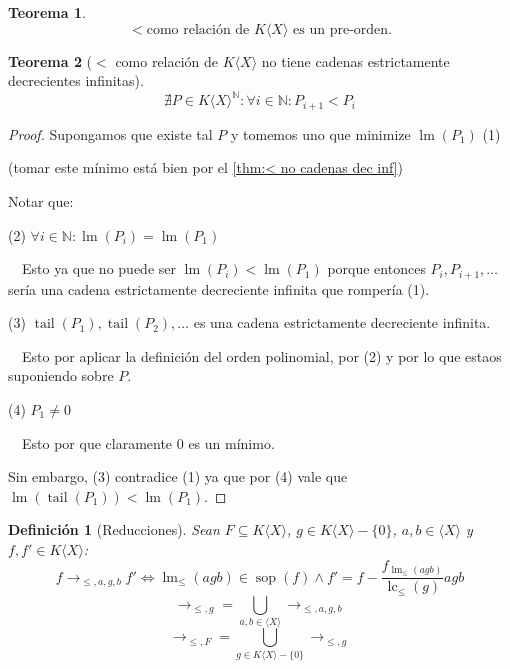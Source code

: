 \documentclass[fleqn]{amsbook} %
\theoremstyle{customstyle}
\newtheorem{definition}{Definición}[section]
\newtheorem{theorem}{Teorema}[section]
\DeclareMathOperator{\sop}{sop}
\DeclareMathOperator{\lm}{lm}
\DeclareMathOperator{\lc}{lc}
\DeclareMathOperator{\tail}{tail}
\begin{document}
\begin{theorem}
\[ < \text{como relación de }K⟨X⟩\text{ es un pre-orden.} \]
\end{theorem}

\begin{theorem}[$<$ como relación de $K⟨X⟩$ no tiene cadenas estrictamente decrecientes infinitas]\label{thm:< en KX no cadenas dec inf}
\[ ∄P ∈ K⟨X⟩^ℕ : ∀i ∈ ℕ : P_{i + 1} < P_i \]
\end{theorem}
\begin{proof}
Supongamos que existe tal $P$ y tomemos uno que minimize $\lm(P_1)$ (1)

(tomar este mínimo está bien por el \cref{thm:< no cadenas dec inf})

Notar que:

(2) $∀i ∈ ℕ : \lm(P_i) = \lm(P_1)$

  Esto ya que no puede ser $\lm(P_i) < \lm(P_1)$ porque entonces $P_i, P_{i + 1}, …$ sería una cadena estrictamente decreciente infinita que rompería (1).


(3) $\tail(P_1), \tail(P_2), …$ es una cadena estrictamente decreciente infinita.

  Esto por aplicar la definición del orden polinomial, por (2) y por lo que estaos suponiendo sobre $P$.

(4) $P_1 ≠ 0$

  Esto por que claramente $0$ es un mínimo.

Sin embargo, (3) contradice (1) ya que por (4) vale que $\lm(\tail(P_1)) < \lm(P_1)$.

\end{proof}

\begin{definition}[Reducciones]
Sean $F ⊆ K⟨X⟩$, $g ∈ K⟨X⟩ - \{0\}$, $a, b ∈ ⟨X⟩$ y $f, f' ∈ K⟨X⟩$:
\[ f →_{≤, a, g, b} f' ⇔ \lm_≤(agb) ∈ \sop(f) ∧ f' = f - \frac{f_{\lm_≤(agb)}}{\lc_≤(g)}agb \]
\[ →_{≤, g} = ⋃_{a, b ∈ ⟨X⟩} →_{≤, a, g, b} \]
\[ →_{≤, F} = ⋃_{g ∈ K⟨X⟩ - \{0\}} →_{≤, g} \]
\end{definition}
\end{document}

